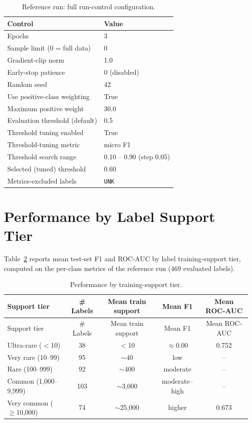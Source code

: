 \documentclass[11pt]{article}
\begin{document}
\begin{table}[h]
\centering
\caption{Reference run: full run-control configuration.}
\label{tab:appendixA}
\begin{tabular}{ll}
\toprule
Control & Value \\
\midrule
Epochs & 3 \\
Sample limit (0 = full data) & 0 \\
Gradient-clip norm & 1.0 \\
Early-stop patience & 0 (disabled) \\
Random seed & 42 \\
Use positive-class weighting & True \\
Maximum positive weight & 30.0 \\
Evaluation threshold (default) & 0.5 \\
Threshold tuning enabled & True \\
Threshold-tuning metric & micro F1 \\
Threshold search range & 0.10 -- 0.90 (step 0.05) \\
Selected (tuned) threshold & 0.60 \\
Metrics-excluded labels & \texttt{UNK} \\
\bottomrule
\end{tabular}
\end{table}

\section{Performance by Label Support Tier}

Table~\ref{tab:appendixB} reports mean test-set F1 and ROC-AUC by label
training-support tier, computed on the per-class metrics of the reference
run (469 evaluated labels).

\begin{longtable}{lcccc}
\caption{Performance by training-support tier.}
\label{tab:appendixB} \\
\toprule
Support tier & \# Labels & Mean train support & Mean F1 & Mean ROC-AUC \\
\midrule
\endfirsthead
\toprule
Support tier & \# Labels & Mean train support & Mean F1 & Mean ROC-AUC \\
\midrule
\endhead
Ultra-rare ($<$10) & 38 & $<$10 & $\approx$0.00 & 0.752 \\
Very rare (10--99) & 95 & $\sim$40 & low & -- \\
Rare (100--999) & 92 & $\sim$400 & moderate & -- \\
Common (1{,}000--9{,}999) & 103 & $\sim$3{,}000 & moderate--high & -- \\
Very common ($\ge$10{,}000) & 74 & $\sim$25{,}000 & higher & 0.673 \\
\bottomrule
\end{longtable}
\end{document}
